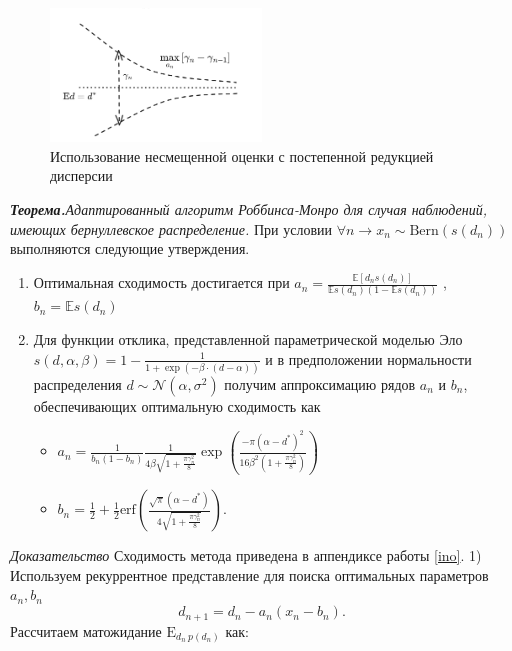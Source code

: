 \begin{figure}[h!]
    \centering
    \includegraphics[width=0.5\textwidth]{assets/work/rating/dispersion_reduction.png}
    \caption{Использование несмещенной оценки с постепенной редукцией дисперсии}
    \label{principal_scheme}
\end{figure}

\textit{\textbf{Теорема.}Адаптированный алгоритм Роббинса-Монро для случая наблюдений, имеющих бернуллевское распределение.} \label{algo} 
При условии $\forall n \rightarrow x_n \sim \text{Bern}(s(d_n))$ выполняются следующие утверждения. \begin{enumerate}
    \item Оптимальная сходимость достигается при $a_n = \frac{\mathbb{E}[d_n s(d_n)]}{\mathbb{E}s(d_n)(1 - \mathbb{E}s(d_n))}$ , $b_n =\mathbb{E} s(d_n)$
    \item Для функции отклика, представленной параметрической моделью Эло $s(d,\alpha,\beta) = 1 - \frac{1}{1+\exp\left(-\beta \cdot(d -\alpha)\right)}$
     и в предположении нормальности распределения $d \sim \mathcal{N}(\alpha,\sigma^2)$ получим аппроксимацию рядов $a_n$ и $b_n$, обеспечивающих оптимальную сходимость как\begin{itemize}
        \item $a_n = \frac{1}{b_n(1-b_n)} \frac{1}{4  \beta \sqrt{1+\frac{\pi\gamma_n^2}{8}}} \exp\left( \frac{- \pi (\alpha-d^*)^2}{16  \beta^2 ( 1+\frac{\pi\gamma_n^2}{8})}\right)$
        \item $b_n = \frac{1}{2} + \frac{1}{2} \text{erf}\left(\frac{\sqrt{\pi} (\alpha-d^*)}{4 \sqrt{1+\frac{\pi\gamma_n^2}{8}}} \right)$.
    \end{itemize} 
\end{enumerate}
\textit{Доказательство}
Сходимость метода приведена в аппендиксе работы \ref{ino}.
1) Используем рекуррентное представление для поиска оптимальных параметров $a_n,b_n$
\begin{equation}
    d_{n+1} = d_n -  a_n(x_n-b_n).
    \label{mod_scheme}
\end{equation}
Рассчитаем матожидание $\mathrm{E}_{d_n ~ p(d_n)}$ как:
